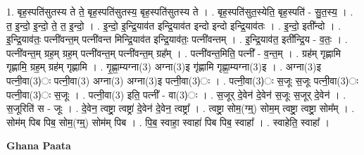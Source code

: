 \documentclass[17pt]{extarticle}
\begin{document}
1. बृह॒स्पति॑सुतस्य ते ते॒ बृह॒स्पति॑सुतस्य॒ बृह॒स्पति॑सुतस्य ते । . बृह॒स्पति॑सुत॒स्येति॒ बृह॒स्पति॑ - सु॒त॒स्य॒ । . त॒ इ॒न्दो॒ इ॒न्दो॒ ते॒ त॒ इ॒न्दो॒ । . इ॒न्दो॒ इ॒न्द्रि॒याव॑त इन्द्रि॒याव॑त इन्दो इन्दो इन्द्रि॒याव॑तः । . इ॒न्दो॒ इती᳚न्दो । . इ॒न्द्रि॒याव॑तः॒ पत्नी॑वन्त॒म् पत्नी॑वन्त मिन्द्रि॒याव॑त इन्द्रि॒याव॑तः॒ पत्नी॑वन्तम् । . इ॒न्द्रि॒याव॑त॒ इती᳚न्द्रि॒य - व॒तः॒ । . पत्नी॑वन्त॒म् ग्रह॒म् ग्रह॒म् पत्नी॑वन्त॒म् पत्नी॑वन्त॒म् ग्रह᳚म् । . पत्नी॑वन्त॒मिति॒ पत्नी᳚ - व॒न्त॒म् । . ग्रह॑म् गृह्णामि गृह्णामि॒ ग्रह॒म् ग्रह॑म् गृह्णामि । . गृ॒ह्णा॒म्यग्ना(3) अग्ना(3)इ गृ॑ह्णामि गृह्णा॒म्यग्ना(3)इ । . अग्ना(3)इ पत्नी॒वा(3)ः पत्नी॒वा(3) अग्ना(3) अग्ना(3)इ पत्नी॒वा(3)ः । . पत्नी॒वा(3)ः स॒जूः स॒जूः पत्नी॒वा(3)ः पत्नी॒वा(3)ः स॒जूः । . पत्नी॒वा(3) इति॒ पत्नी᳚ - वा(3)ः । . स॒जूर् दे॒वेन॑ दे॒वेन॑ स॒जूः स॒जूर् दे॒वेन॑ । . स॒जूरिति॑ स - जूः । . दे॒वेन॒ त्वष्ट्रा॒ त्वष्ट्रा॑ दे॒वेन॑ दे॒वेन॒ त्वष्ट्रा᳚ । . त्वष्ट्रा॒ सोम॒(ग्म्॒) सोम॒म् त्वष्ट्रा॒ त्वष्ट्रा॒ सोम᳚म् । . सोम॑म् पिब पिब॒ सोम॒(ग्म्॒) सोम॑म् पिब । . पि॒ब॒ स्वाहा॒ स्वाहा॑ पिब पिब॒ स्वाहा᳚ । . स्वाहेति॒ स्वाहा᳚ । \newline

\textbf{Ghana Paata } \newline
\end{document}
